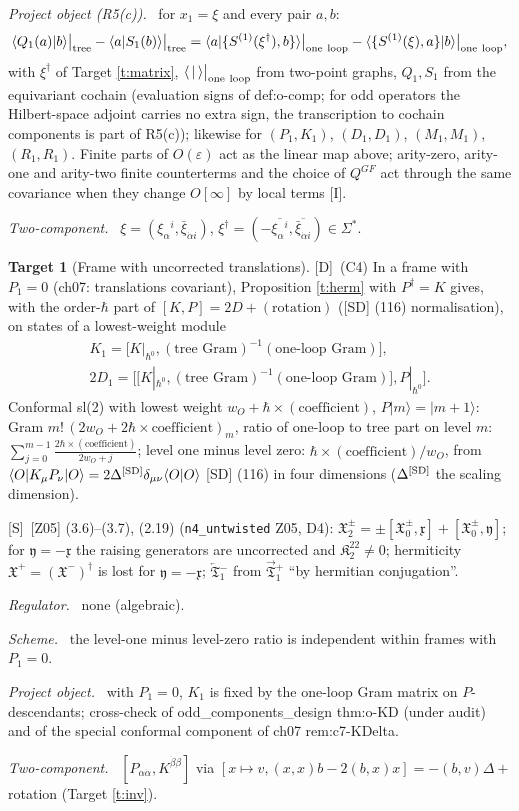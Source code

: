 \documentclass[11pt]{article}
\theoremstyle{definition}
\newtheorem{target}{Target}
\newcommand{\Sl}{\textup{[S]}}
\newcommand{\Dl}{\textup{[D]}}
\newcommand{\Il}{\textup{[I]}}
\newcommand{\tree}{\big|_{\rm tree}}
\newcommand{\oneloop}{\big|_{\rm one\ loop}}
\newcommand{\fld}[1]{\par\textit{#1.}\ }
\begin{document}
\fld{Project object (R5(c))} for $x_1=\xi$ and every pair $a,b$:
\[
\langle Q_1(a)|b\rangle\tree-\langle a|S_1(b)\rangle\tree=\langle a|\{S^{(1)}(\xi^\dagger),b\}\rangle\oneloop-\langle\{S^{(1)}(\xi),a\}|b\rangle\oneloop,
\]
with $\xi^\dagger$ of Target \ref{t:matrix}, $\langle\,|\,\rangle\oneloop$ from two-point graphs, $Q_1,S_1$ from the equivariant cochain (evaluation signs of def:o-comp; for odd operators the Hilbert-space adjoint carries no extra sign, the transcription to cochain components is part of R5(c)); likewise for $(P_1,K_1)$, $(D_1,D_1)$, $(M_1,M_1)$, $(R_1,R_1)$. Finite parts of $O(\varepsilon)$ act as the linear map above; arity-zero, arity-one and arity-two finite counterterms and the choice of $Q^{GF}$ act through the same covariance when they change $O[\infty]$ by local terms \Il.
\fld{Two-component} $\xi=(\xi_\alpha{}^i,\bar\xi_{\dot\alpha i})$, $\xi^\dagger=(-\overline{\xi_\alpha{}^i},\overline{\bar\xi_{\dot\alpha i}})\in\Sigma^*$.

\begin{target}[Frame with uncorrected translations]\label{t:Pframe}
\Dl\ (C4) In a frame with $P_1=0$ (ch07: translations covariant), Proposition \ref{t:herm} with $P^\dagger=K$ gives, with the order-$\hbar$ part of $[K,P]=2D+(\text{rotation})$ ([SD] (116) normalisation), on states of a lowest-weight module
\[
\begin{gathered}
K_1=\big[K|_{\hbar^0},(\text{tree Gram})^{-1}(\text{one-loop Gram})\big],\\
2D_1=\Big[\big[K|_{\hbar^0},(\text{tree Gram})^{-1}(\text{one-loop Gram})\big],P|_{\hbar^0}\Big].
\end{gathered}
\]
Conformal sl(2) with lowest weight $w_O+\hbar\times(\text{coefficient})$, $P|m\rangle=|m+1\rangle$: Gram $m!\,(2w_O+2\hbar\times\text{coefficient})_m$, ratio of one-loop to tree part on level $m$: $\sum_{j=0}^{m-1}\frac{2\hbar\times(\text{coefficient})}{2w_O+j}$; level one minus level zero: $\hbar\times(\text{coefficient})/w_O$, from $\langle O|K_\mu P_\nu|O\rangle=2\Delta^{\rm[SD]}\delta_{\mu\nu}\langle O|O\rangle$ [SD] (116) in four dimensions ($\Delta^{\rm[SD]}$ the scaling dimension).
\par\Sl\ [Z05] (3.6)--(3.7), (2.19) (\texttt{n4\_untwisted} Z05, D4): $\mathfrak X^\pm_2=\pm[\mathfrak X^\pm_0,\mathfrak x]+[\mathfrak X^\pm_0,\mathfrak y]$; for $\mathfrak y=-\mathfrak x$ the raising generators are uncorrected and $\mathfrak K^{22}_2\ne0$; hermiticity $\mathfrak X^+=(\mathfrak X^-)^\dagger$ is lost for $\mathfrak y=-\mathfrak x$; $\overleftarrow{\mathfrak T}{}^-_1$ from $\overrightarrow{\mathfrak T}{}^+_1$ ``by hermitian conjugation''.
\fld{Regulator} none (algebraic). \fld{Scheme} the level-one minus level-zero ratio is independent within frames with $P_1=0$.
\fld{Project object} with $P_1=0$, $K_1$ is fixed by the one-loop Gram matrix on $P$-descendants; cross-check of odd\_components\_design thm:o-KD (under audit) and of the special conformal component of ch07 rem:c7-KDelta.
\fld{Two-component} $[P_{\alpha\dot\alpha},K^{\dot\beta\beta}]$ via $[x\mapsto v,(x,x)b-2(b,x)x]=-(b,v)\Delta+$ rotation (Target \ref{t:inv}).
\end{target}
\end{document}
